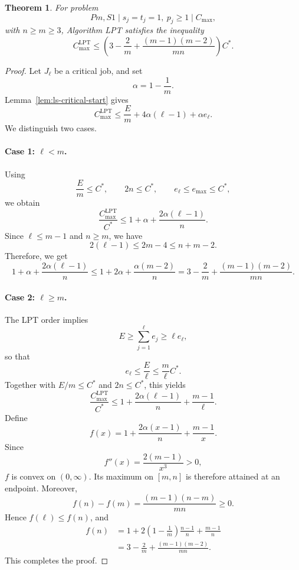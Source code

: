\documentclass[11pt]{article}
\newtheorem{theorem}{Theorem}[section]
\begin{document}
\begin{theorem}
\label{thm:lpt-general-m}
For problem 
\[
        Pm,S1\mid s_j=t_j=1,\ p_j\ge1\mid C_{\max},
\]
with \(n\ge m\ge3\), Algorithm LPT satisfies the inequality 
\[
        C_{\max}^{\mathrm{LPT}}
        \le
        \left(
        3-\frac2m+
        \frac{(m-1)(m-2)}{mn}
        \right)C^*.
\]
\end{theorem}

\begin{proof}
Let \(J_\ell\) be a critical job, and set
\[
        \alpha=1-\frac1m.
\]
Lemma~\ref{lem:ls-critical-start} gives
\[
        C_{\max}^{\mathrm{LPT}}
        \le
        \frac{E}{m}
        +4\alpha(\ell-1)
        +\alpha e_\ell.
\]
We distinguish two cases.

\paragraph{Case 1: \(\ell<m\).}
Using
\[
        \frac{E}{m}\le C^*,
        \qquad
        2n\le C^*,
        \qquad
        e_\ell\le e_{\max}\le C^*,
\]
we obtain
\[
        \frac{C_{\max}^{\mathrm{LPT}}}{C^*}
        \le
        1+\alpha+
        \frac{2\alpha(\ell-1)}{n}.
\]
Since \(\ell\le m-1\) and \(n\ge m\), we have 
\[
        2(\ell-1)\le2m-4\le n+m-2.
\]
Therefore, we get 
\[
        1+\alpha+
        \frac{2\alpha(\ell-1)}{n}
        \le
        1+2\alpha+
        \frac{\alpha(m-2)}{n}
        =
        3-\frac2m+
        \frac{(m-1)(m-2)}{mn}.
\]

\paragraph{Case 2: \(\ell\ge m\).}
The LPT order implies
\[
        E\ge\sum_{j=1}^{\ell}e_j\ge\ell e_\ell,
\]
so that
\[
        e_\ell\le\frac{E}{\ell}\le\frac{m}{\ell}C^*.
\]
Together with \(E/m\le C^*\) and \(2n\le C^*\), this yields
\[
        \frac{C_{\max}^{\mathrm{LPT}}}{C^*}
        \le
        1+
        \frac{2\alpha(\ell-1)}{n}
        +
        \frac{m-1}{\ell}.
\]
Define
\[
        f(x)
        =
        1+
        \frac{2\alpha(x-1)}{n}
        +
        \frac{m-1}{x}.
\]
Since
\[
        f''(x)=\frac{2(m-1)}{x^3}>0,
\]
\(f\) is convex on \((0,\infty)\). Its maximum on \([m,n]\) is therefore
attained at an endpoint. Moreover,
\[
        f(n)-f(m)
        =
        \frac{(m-1)(n-m)}{mn}
        \ge0.
\]
Hence \(f(\ell)\le f(n)\), and
\[
\begin{aligned}
        f(n)
        &=
        1+
        2\left(1-\frac1m\right)\frac{n-1}{n}
        +
        \frac{m-1}{n} \\
        &=
        3-\frac2m+
        \frac{(m-1)(m-2)}{mn}.
\end{aligned}
\]
This completes the proof.
\end{proof}
\end{document}
